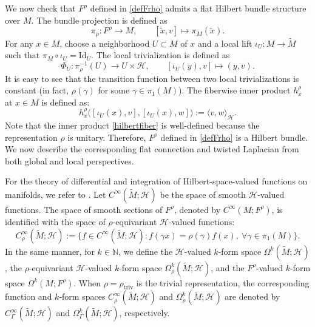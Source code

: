 \documentclass[11pt,oneside,reqno]{amsart}
\newcommand\N{\ensuremath{\mathbb{N}}}
\theoremstyle{definition}
\numberwithin{equation}{section}
\theoremstyle{plain}
\begin{document}
We now check that $F^{\rho}$ defined in \eqref{defFrho} admits a flat Hilbert bundle structure over $M$. The bundle projection is defined as
\begin{equation}
    \pi_\rho:F^\rho \rightarrow M, \qquad [\widetilde{x},v] \mapsto \pi_M(\widetilde{x}).
\end{equation}
For any $x\in M$, choose a neighborhood $U\subset M $ of $x$ and a local lift $\iota_U:M\rightarrow \widetilde{M}$ such that $\pi_M\circ \iota_U = \mathrm{Id}_U$. The local trivialization is defined as
\begin{equation}
    \Phi_U:\pi_{\rho}^{-1} (U) \rightarrow U\times \mathcal{H}  , \qquad [\iota_U(y),v] \mapsto (y,v) .
\end{equation}
It is easy to see that the transition function between two local trivializations is constant (in fact, $\rho(\gamma)$ for some $\gamma\in \pi_1(M)$). The fiberwise inner product $h_x^\rho$ at $x\in M$ is defined as:
\begin{equation}\label{hilbertfiber}
    h_x^\rho \big( [\iota_U(x),v], [\iota_U(x),w] \big) := \langle v,w\rangle_{\mathcal{H}}.
\end{equation}
Note that the inner product \eqref{hilbertfiber} is well-defined because the representation $\rho$ is unitary. Therefore, $F^\rho$ defined in \eqref{defFrho} is a Hilbert bundle. We now describe the corresponding flat connection and twisted Laplacian from both global and local perspectives.


For the theory of differential and integration of Hilbert-space-valued functions on manifolds, we refer to \cite{HillePhillips1974semigroups, Kato1966pertubation}. Let $C^{\infty}(\widetilde{M} ; \mathcal{H})$ be the space of smooth $\mathcal{H}$-valued functions. The space of smooth sections of  $F^{\rho}$, denoted by $C^{\infty}(M; F^{\rho})$, is identified with the space of $\rho$-equivariant $\mathcal{H}$-valued functions:
\begin{equation*}
  C^{\infty}_{\rho}(\widetilde{M} ; \mathcal{H}) := \{f \in C^{\infty}(\widetilde{M} ; \mathcal{H}) : f(\gamma x) = \rho(\gamma)f(x), \ \forall \gamma \in \pi_1(M)\}.  
\end{equation*}
In the same manner, for $k\in \N$, we define the $\mathcal{H}$-valued $k$-form space $\Omega^{k}(\widetilde{M}; \mathcal{H})$, the $\rho$-equivariant $\mathcal{H}$-valued $k$-form space $\Omega^{k}_{\rho}(\widetilde{M}; \mathcal{H})$, and the $F^{\rho}$-valued $k$-form space $\Omega^{k}(M; F^{\rho})$. When $\rho=\rho_{\mathrm{triv}}$ is the trivial representation, the corresponding function and $k$-form spaces $C^{\infty}_{\rho}(\widetilde{M} ; \mathcal{H})$ and $\Omega^{k}_{\rho}(\widetilde{M}; \mathcal{H})$ are denoted by $C^{\infty}_{\Gamma}(\widetilde{M}; \mathcal{H})$ and $\Omega^{k}_{\Gamma}(\widetilde{M}; \mathcal{H})$, respectively. 
\end{document}
